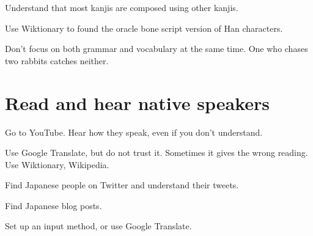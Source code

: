 \documentclass[12pt,openany]{book}
\begin{document}
Understand that most kanjis are composed using other kanjis.

Use Wiktionary to found the oracle bone script version of Han characters.

Don't focus on both grammar and vocabulary at the same time.
One who chases two rabbits catches neither.

\section{Read and hear native speakers}

Go to YouTube.
Hear how they speak, even if you don't understand.

Use Google Translate, but do not trust it.
Sometimes it gives the wrong reading.
Use Wiktionary, Wikipedia.

Find Japanese people on Twitter and understand their tweets.

Find Japanese blog posts.

Set up an input method, or use Google Translate.








\end{document}
